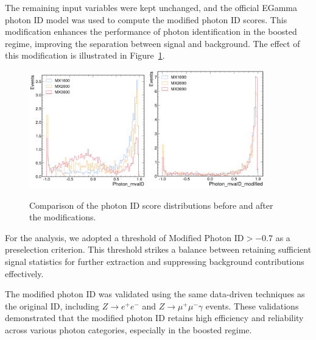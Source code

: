 The remaining input variables were kept unchanged, and the official EGamma photon ID model was used to compute the modified photon ID scores.
This modification enhances the performance of photon identification in the boosted regime, improving the separation between signal and background.
The effect of this modification is illustrated in Figure~\ref{fig:BeforeAfterScorePhotonIDModifications}.
\begin{figure}[!htbp]
    \centering
    \includegraphics[width=0.45\textwidth]{figures/appendix/ModifiedPhotonID/EGamma_PhotonmvaID_3Xmass.pdf}%
    \includegraphics[width=0.45\textwidth]{figures/appendix/ModifiedPhotonID/PhotonmvaID_modified_3Xmass.pdf}
    \caption{Comparison of the photon ID score distributions before and after the modifications.}
    \label{fig:BeforeAfterScorePhotonIDModifications}
\end{figure}

For the analysis, we adopted a threshold of $\text{Modified Photon ID} > -0.7$ as a preselection criterion.
This threshold strikes a balance between retaining sufficient signal statistics for further extraction and suppressing background contributions effectively.

The modified photon ID was validated using the same data-driven techniques as the original ID, including $Z \to e^+e^-$ and $Z \to \mu^+\mu^-\gamma$ events.
These validations demonstrated that the modified photon ID retains high efficiency and reliability across various photon categories,
especially in the boosted regime.
